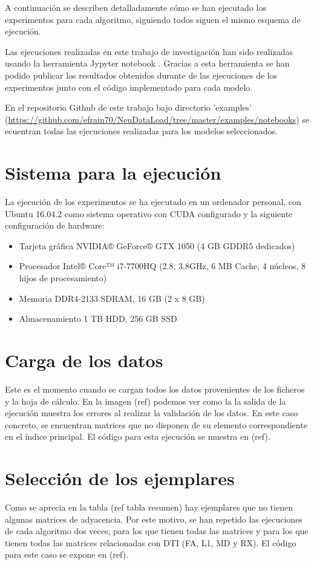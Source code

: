 A continuación se describen detalladamente cómo se han ejecutado los experimentos para cada algoritmo, siguiendo todos siguen el mismo esquema de ejecución.

Las ejecuciones realizadas en este trabajo de investigación han sido realizadas usando la herramienta Jypyter notebook \cite{ProjectHome}. Gracias a esta herramienta se han podido publicar los resultados obtenidos durante de las ejecuciones de los experimentos  junto con el código implementado para cada modelo. 

En el repositorio Github de este trabajo bajo directorio 'examples' (\url{https://github.com/efrain70/NeuDataLoad/tree/master/examples/notebooks}) se ecuentran todas las ejecuciones realizadas para los modelos seleccionados.

\section{Sistema para la ejecución}
La ejecución de los experimentos se ha ejecutado en un ordenador personal, con Ubuntu 16.04.2 como sistema operativo con CUDA \cite{ProcesamientoNVIDIA} configurado y la siguiente configuración de hardware:
\begin{itemize}
    \item Tarjeta gráfica NVIDIA® GeForce® GTX 1050 (4 GB GDDR5 dedicados)
    \item Procesador Intel® Core™ i7-7700HQ (2.8, 3.8GHz, 6 MB Cache, 4 núcleos, 8 hijos de procesamiento)
    \item Memoria DDR4-2133 SDRAM, 16 GB (2 x 8 GB)
    \item Almacenamiento 1 TB HDD,  256 GB SSD
\end{itemize}

\section{Carga de los datos}
Este es el momento cuando se cargan todos los datos provenientes de los ficheros y la hoja de cálculo. En la imagen (ref) podemos ver como la la salida de la ejecución muestra los errores al realizar la validación de los datos. En este caso concreto, se encuentran matrices que no disponen de su elemento correspondiente en el índice principal. El código para esta ejecución se muestra en (ref).

\section{Selección de los ejemplares}
Como se aprecia en la tabla (ref tabla resumen) hay ejemplares que no tienen algunas matrices de adyacencia. Por este motivo, se han repetido las ejecuciones de cada algoritmo dos veces; para los que tienen todas las matrices y para los que tienen todas las matrices relacionadas con DTI (FA, L1, MD y RX). El código para este caso se expone en (ref).


